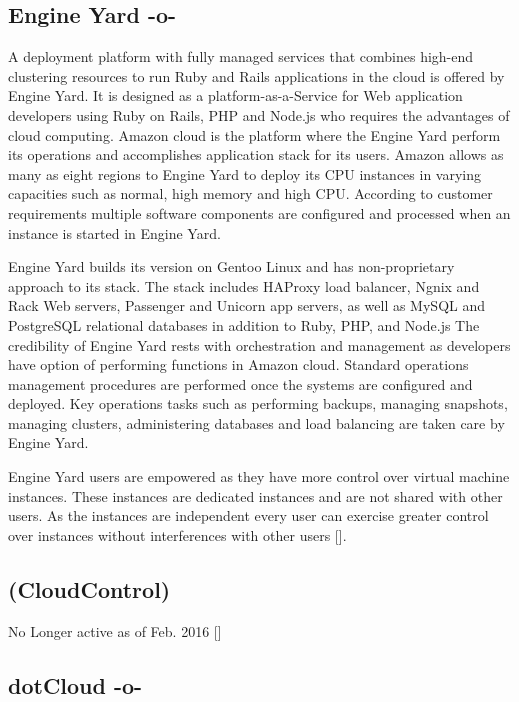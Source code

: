 \subsection{Engine Yard -o-}

A deployment platform with fully managed services that combines
high-end clustering resources to run Ruby and Rails applications in
the cloud is offered by Engine Yard. It is designed as a
platform-as-a-Service for Web application developers using Ruby on
Rails, PHP and Node.js who requires the advantages of cloud
computing. Amazon cloud is the platform where the Engine Yard perform
its operations and accomplishes application stack for its
users. Amazon allows as many as eight regions to Engine Yard to deploy
its CPU instances in varying capacities such as normal, high memory
and high CPU. According to customer requirements multiple software
components are configured and processed when an instance is started in
Engine Yard.
    
Engine Yard builds its version on Gentoo Linux and has non-proprietary
approach to its stack. The stack includes HAProxy load balancer, Ngnix
and Rack Web servers, Passenger and Unicorn app servers, as well as
MySQL and PostgreSQL relational databases in addition to Ruby, PHP,
and Node.js The credibility of Engine Yard rests with orchestration
and management as developers have option of performing functions in
Amazon cloud. Standard operations management procedures are performed
once the systems are configured and deployed. Key operations tasks
such as performing backups, managing snapshots, managing clusters,
administering databases and load balancing are taken care by Engine
Yard.
    
Engine Yard users are empowered as they have more control over virtual
machine instances. These instances are dedicated instances and are not
shared with other users. As the instances are independent every user
can exercise greater control over instances without interferences with
other users [\cite{www-engineyard}].




\subsection{ (CloudControl)}

No Longer active as of Feb. 2016 [\cite{www-wiki}]

\subsection{dotCloud -o-}

